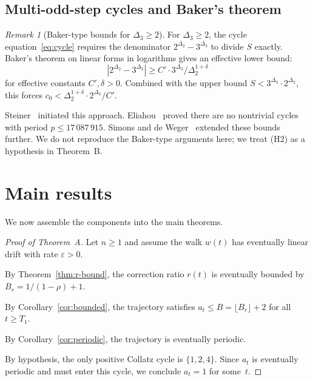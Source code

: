 \documentclass[manuscript]{aomart}
\theoremstyle{plain}
\theoremstyle{definition}
\theoremstyle{remark}
\newtheorem{remark}[theorem]{Remark}
\numberwithin{equation}{section}
\begin{document}
\subsection{Multi-odd-step cycles and Baker's theorem}

\begin{remark}[Baker-type bounds for $\Delta_3 \ge 2$]
\label{rem:baker}
For $\Delta_3 \ge 2$, the cycle equation~\eqref{eq:cycle} requires
the denominator $2^{\Delta_2} - 3^{\Delta_3}$ to divide $S$ exactly.
Baker's theorem on linear forms in logarithms
\cite{Baker1975} gives an effective lower bound:
\[
  |2^{\Delta_2} - 3^{\Delta_3}|
  \ge C' \cdot 3^{\Delta_3} / \Delta_2^{1+\delta}
\]
for effective constants $C', \delta > 0$.  Combined with the upper
bound $S < 3^{\Delta_3} \cdot 2^{\Delta_2}$, this forces
$c_0 < \Delta_2^{1+\delta} \cdot 2^{\Delta_2} / C'$.

Steiner~\cite{Steiner1977} initiated this approach.
Eliahou~\cite{Eliahou1993} proved there are no nontrivial cycles with
period $p \le 17\,087\,915$.
Simons and de Weger~\cite{SimonsDeWeger2005} extended these bounds
further.  We do not reproduce the Baker-type arguments here; we treat
(H2) as a hypothesis in Theorem~B.
\end{remark}

\section{Main results}\label{sec:main}

We now assemble the components into the main theorems.

\begin{proof}[Proof of Theorem~A]
Let $n \ge 1$ and assume the walk $w(t)$ has eventually linear drift
with rate $\varepsilon > 0$.

By Theorem~\ref{thm:r-bound}, the correction ratio $r(t)$ is
eventually bounded by $B_r = 1/(1-\rho) + 1$.

By Corollary~\ref{cor:bounded}, the trajectory satisfies
$a_t \le B = \lfloor B_r \rfloor + 2$ for all $t \ge T_1$.

By Corollary~\ref{cor:periodic}, the trajectory is eventually
periodic.

By hypothesis, the only positive Collatz cycle is $\{1, 2, 4\}$.
Since $a_t$ is eventually periodic and must enter this cycle, we
conclude $a_t = 1$ for some~$t$.
\end{proof}
\end{document}
